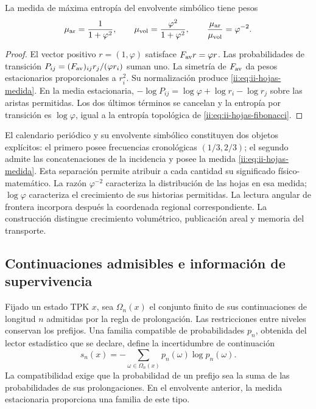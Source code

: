 \begin{proposition}
La medida de máxima entropía del envolvente simbólico tiene pesos
\begin{equation}
 \mu_{\rm ar}=\frac{1}{1+\varphi^2},\qquad
 \mu_{\rm vol}=\frac{\varphi^2}{1+\varphi^2},\qquad
 \frac{\mu_{\rm ar}}{\mu_{\rm vol}}=\varphi^{-2}.
 \label{ii:eq:ii-hojas-medida}
\end{equation}
\end{proposition}
\begin{proof}
El vector positivo \(r=(1,\varphi)\) satisface
\(F_{\rm av}r=\varphi r\). Las probabilidades de transición
\(P_{ij}=(F_{\rm av})_{ij}r_j/(\varphi r_i)\) suman uno.
La simetría de \(F_{\rm av}\) da pesos estacionarios proporcionales
a \(r_i^2\). Su normalización produce
\eqref{ii:eq:ii-hojas-medida}. En la media estacionaria,
\(-\log P_{ij}=\log\varphi+\log r_i-\log r_j\) sobre las
aristas permitidas. Los dos últimos términos se cancelan y la
entropía por transición es \(\log\varphi\), igual a la entropía
topológica de \eqref{ii:eq:ii-hojas-fibonacci}.
\end{proof}

El calendario periódico y su envolvente simbólico constituyen dos
objetos explícitos: el primero posee frecuencias cronológicas
\((1/3,2/3)\); el segundo admite las concatenaciones de la incidencia
y posee la medida \eqref{ii:eq:ii-hojas-medida}. Esta separación permite
atribuir a cada cantidad su significado físico-matemático. La razón
\(\varphi^{-2}\) caracteriza la distribución de las hojas en esa
medida; \(\log\varphi\) caracteriza el crecimiento de sus historias
permitidas. La lectura angular de frontera incorpora después la
coordenada regional correspondiente. La construcción distingue
crecimiento volumétrico, publicación areal y memoria del transporte.

\subsection{Continuaciones admisibles e información de supervivencia}
\label{ii:sec:ii-informacion-supervivencia}

Fijado un estado TPK \(x\), sea \(\Omega_n(x)\) el conjunto finito
de sus continuaciones de longitud \(n\) admitidas por la regla de
prolongación. Las restricciones entre niveles conservan los prefijos.
Una familia compatible de probabilidades \(p_n\), obtenida del
lector estadístico que se declare, define la incertidumbre de
continuación
\begin{equation}
 s_n(x)=-\sum_{\omega\in\Omega_n(x)}
                 p_n(\omega)\log p_n(\omega).
 \label{ii:eq:ii-entropia-continuaciones}
\end{equation}
La compatibilidad exige que la probabilidad de un prefijo sea la suma
de las probabilidades de sus prolongaciones. En el envolvente anterior,
la medida estacionaria proporciona una familia de este tipo.

